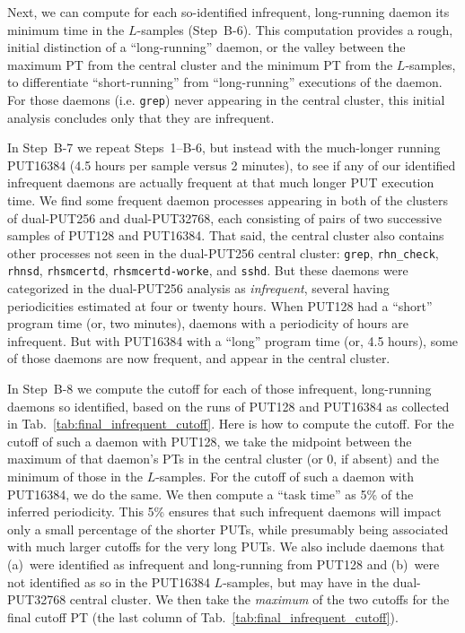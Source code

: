 \documentclass[letter]{ieice}
\begin{document}
Next, we can compute for each so-identified infrequent, long-running daemon its
minimum time in the \hbox{$L$-samples} ({\color{blue}Step~B-6}). 
This computation provides a rough, initial distinction of a ``long-running''
daemon, or the valley between the maximum PT from the central cluster 
and the minimum PT from the $L$-samples, to differentiate ``short-running'' 
from ``\hbox{long-running}'' executions of the daemon. 
For those daemons (i.e. {\tt grep}) never appearing in the central cluster,
this initial \hbox{analysis} concludes only that they are infrequent.

In {\color{blue}Step~B-7} we repeat {\color{blue}Steps~1--B-6}, but instead with the much-longer running
PUT16384 (4.5 hours per \hbox{sample} versus 2 minutes), to see 
if any of our identified \hbox{infrequent} daemons are actually frequent 
at that much longer PUT execution time. 
We find some frequent daemon processes appearing in both of the 
clusters of \hbox{dual-PUT256} and \hbox{dual-PUT32768}, each consisting of 
pairs of two successive samples of PUT128 and PUT16384.
That said, the central cluster also contains other
  processes not seen in the \hbox{dual-PUT256} central cluster: 
  {\tt grep}, {\tt rhn\_check}, {\tt rhnsd}, {\tt rhsmcertd}, 
  {\tt rhsmcertd-worke}, and {\tt sshd}. 
  But these daemons were categorized in the \hbox{dual-PUT256} analysis as {\em
  infrequent}, several having \hbox{periodicities} estimated at four or twenty hours.
When PUT128 had a ``short'' 
program time (or, two minutes), daemons with a periodicity of
hours are \hbox{infrequent}. But with PUT16384 
with a ``long'' program time (or, 4.5 hours),
some of those daemons are now frequent, and appear in the central cluster.

In {\color{blue}Step~B-8} we compute 
the cutoff for each of those infrequent, long-running daemons so
identified, based on the runs of PUT128 and 
PUT16384 as collected in Tab.~\ref{tab:final_infrequent_cutoff}. 
Here is how to compute the cutoff. For the cutoff of such a daemon with PUT128, 
we take the \hbox{midpoint} between the maximum of that daemon's PTs in the 
central cluster (or 0, if absent) and the \hbox{minimum} of those in the $L$-samples. 
For the cutoff of such a daemon with PUT16384, we do the same. 
We then compute a ``task time'' as 5\% of the inferred periodicity. 
This 5\% ensures that such infrequent daemons will impact 
only a small percentage of the shorter PUTs, while presumably being 
associated with much larger cutoffs for the very long PUTs. 
We also include daemons that (a)~were identified as infrequent and 
\hbox{long-running} from PUT128 and (b)~were not identified as so in the PUT16384 
\hbox{$L$-samples}, but may have in the \hbox{dual-PUT32768} central cluster.
We then take the {\em maximum} of the two cutoffs for the final cutoff PT 
(the last column of Tab.~\ref{tab:final_infrequent_cutoff}). 
\end{document}
